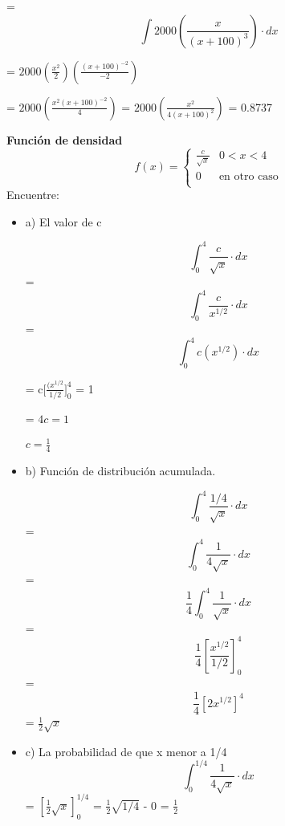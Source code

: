 \documentclass{../oxmathproblems}
\begin{document}
\begin{questions}
\begin{itemize}
=   \begin{equation}
\int 2000 (\frac{x}{(x+100)^3}) \cdot dx
\end{equation}

= 
$2000 (\frac{x^2}{2})(\frac{(x+100)^{-2}}{-2})$

= $2000 (\frac{x^2(x+100)^{-2}}{4})$ =  $2000 (\frac{x^2}{4(x+100)^{2}})$ = 0.8737

\end{itemize}

\miquestion\textbf{Función de densidad}
\[ 
f(x) = 
     \begin{cases}
       \frac{c}{\sqrt{x}} & 0 <x < 4 \\
       0 & \text{en otro caso} \\
     \end{cases}
\]
$$$$
Encuentre:  
\begin{itemize}
\item  a) El valor de c

\begin{equation}
\int_{0}^{4} \frac{c}{\sqrt{x}} \cdot dx
\end{equation}
= \begin{equation}
\int_{0}^{4} \frac{c}{x^{1/2}} \cdot dx
\end{equation}
= \begin{equation}
\int_{0}^{4} c(x^{1/2}) \cdot dx
\end{equation}

= c[$\frac{(x^{1/2}}{1/2}]^{4}_{0}$  = 1

= $ 4c = 1 $ 

$ c = \frac{1}{4} $ 

\item  b) Función de distribución acumulada. 

\begin{equation}
\int_{0}^{4} \frac{1/4}{\sqrt{x}} \cdot dx
\end{equation}
= 
\begin{equation}
\int_{0}^{4} \frac{1}{4\sqrt{x}} \cdot dx
\end{equation}
= 
\begin{equation}
 \frac{1}{4} \int_{0}^{4} \frac{1}{\sqrt{x}} \cdot dx
\end{equation}
= 
$$ \frac{1}{4}[\frac{x^{1/2}}{1/2}]^{4}_{0}
$$
= $$ \frac{1}{4}[2x^{1/2}]^{4}
$$
= $\frac{1}{2}\sqrt{x}$


\item  c) La probabilidad de que x menor a 1/4
\begin{equation}
\int_{0}^{1/4} \frac{1}{4\sqrt{x}} \cdot dx
\end{equation} 
=  $[\frac{1}{2}\sqrt{x}]_{0}^{1/4}$ = $\frac{1}{2}\sqrt{1/4}$ - 0 
= $\frac{1}{2}$ 




\end{itemize}
\end{questions}
\end{document}

